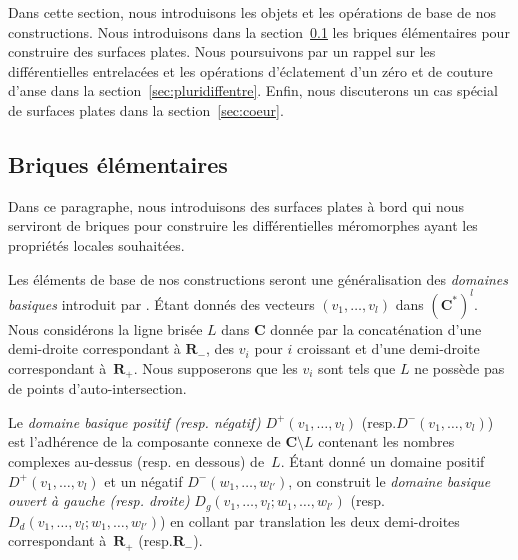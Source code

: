 \documentclass[11pt]{article}
\newcommand{\resp}{resp.\xspace}
\numberwithin{equation}{section}\renewcommand{\proofname}{Démonstration}
\newcommand{\RR}{\mathbf{R}}
\newcommand{\CC}{\mathbf{C}}
\theoremstyle{definition}
\begin{document}
Dans cette section, nous introduisons les objets et les opérations de base de nos constructions. Nous introduisons dans la section~\ref{sec:briques} les briques élémentaires pour construire des surfaces plates. Nous poursuivons par un rappel sur les différentielles entrelacées et les opérations d’éclatement d'un zéro et de couture d'anse dans la section~\ref{sec:pluridiffentre}. Enfin, nous discuterons un cas spécial de surfaces plates dans la section~\ref{sec:coeur}.

\subsection{Briques élémentaires}
\label{sec:briques}

Dans ce paragraphe, nous introduisons des surfaces plates à bord qui nous serviront de briques pour construire les différentielles méromorphes ayant les propriétés locales souhaitées.

Les éléments de base de nos constructions seront une généralisation des \emph{domaines basiques} introduit par \cite{Bo}. Étant donnés des vecteurs $(v_{1},\dots,v_{l})$ dans $(\CC^{\ast})^{l}$. Nous considérons la ligne brisée $L$ dans $\CC$ donnée par la concaténation d'une demi-droite correspondant à $\RR_{-}$, des $v_{i}$ pour $i$ croissant et d'une demi-droite correspondant à~$\RR_{+}$.
Nous supposerons que les $v_{i}$ sont tels que $L$ ne possède pas de points d'auto-intersection.

Le \emph{domaine basique positif (\resp négatif)} $D^{+}(v_{1},\dots,v_{l})$ (\resp $D^{-}(v_{1},\dots,v_{l})$) est l'adhérence de la composante connexe de $\CC\setminus L$ contenant les nombres complexes au-dessus (\resp en dessous) de~$L$.
Étant donné un domaine positif $D^{+}(v_{1},\dots,v_{l})$ et un négatif $D^{-}(w_{1},\dots,w_{l'})$, on construit le \emph{domaine basique ouvert à gauche (\resp droite)} $D_{g}(v_{1},\dots,v_{l};w_{1},\dots,w_{l'})$ (\resp $D_{d}(v_{1},\dots,v_{l};w_{1},\dots,w_{l'})$) en collant par translation les deux demi-droites correspondant à~$\RR_{+}$ (\resp $\RR_{-}$).
\end{document}
